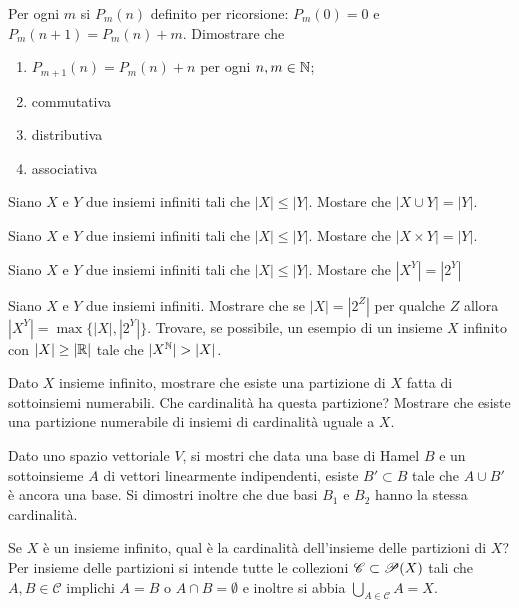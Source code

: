\begin{es}
  Per ogni $ m $ si $ P_m(n) $ definito per ricorsione: $ P_m(0) = 0 $ e $ P_m(n + 1) = P_m(n) + m $. Dimostrare che
  \begin{enumerate}
  \item $ P_{m + 1}(n) = P_m(n) + n $ per ogni $ n, m \in \N $;
  \item commutativa
  \item distributiva
  \item associativa
  \end{enumerate}
\end{es}

\begin{es}
  Siano $ X $ e $ Y $ due insiemi infiniti tali che $ |X| \leq |Y| $. Mostare che $ |X \cup Y| = |Y| $.
\end{es}

\begin{es}
  Siano $ X $ e $ Y $ due insiemi infiniti tali che $ |X| \leq |Y| $. Mostare che $ |X \times Y| = |Y| $.
\end{es}

\begin{es}
  Siano $ X $ e $ Y $ due insiemi infiniti tali che $ |X| \leq |Y| $. Mostare che $ |X^Y| = |2^Y| $
\end{es}

\begin{es}
  Siano $ X $ e $ Y $ due insiemi infiniti. Mostrare che se $ |X| = |2^Z| $ per qualche $ Z $ allora $ |X^Y| = \max\{|X|, |2^Y|\} $. Trovare, se possibile, un esempio di un insieme $ X $ infinito con $ |X| \geq |\R| $ tale che $ |X^\N| > |X| $.
\end{es}

\begin{es}
  Dato $ X $ insieme infinito, mostrare che esiste una partizione di $ X $ fatta di sottoinsiemi numerabili. Che cardinalità ha questa partizione? Mostrare che esiste una partizione numerabile di insiemi di cardinalità uguale a $ X $.
\end{es}

\begin{es}
  Dato uno spazio vettoriale $ V $, si mostri che data una base di Hamel $ B $ e un sottoinsieme $ A $ di vettori linearmente indipendenti, esiste $ B' \subset B $ tale che $ A \cup B' $ è ancora una base. Si dimostri inoltre che due basi $ B_1 $ e $ B_2 $ hanno la stessa cardinalità.
\end{es}

\begin{es}
  Se $ X $ è un insieme infinito, qual è la cardinalità dell'insieme delle partizioni di $ X $? Per insieme delle partizioni si intende tutte le collezioni $ \mathscr{C} \subset \P(X) $ tali che $ A, B \in \mathscr{C} $ implichi $ A = B $ o $ A \cap B = \emptyset $ e inoltre si abbia $ \bigcup_{A \in \mathscr{C}} A = X $.
\end{es}

